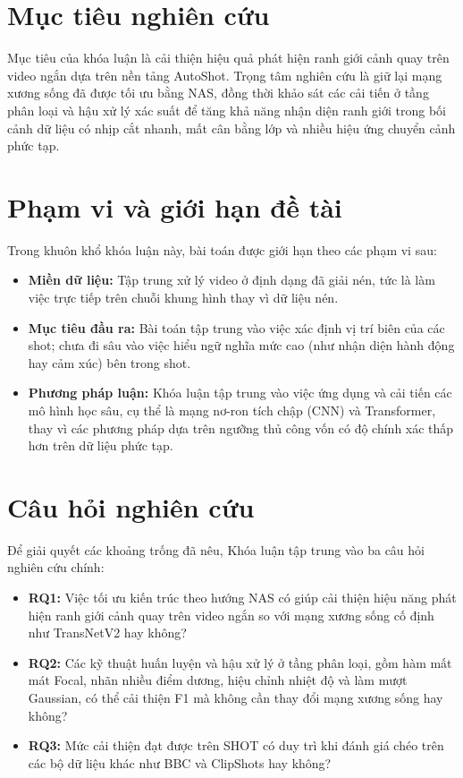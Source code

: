 \section{Mục tiêu nghiên cứu}
Mục tiêu của khóa luận là cải thiện hiệu quả phát hiện ranh giới cảnh quay trên video ngắn dựa trên nền tảng AutoShot. Trọng tâm nghiên cứu là giữ lại mạng xương sống đã được tối ưu bằng NAS, đồng thời khảo sát các cải tiến ở tầng phân loại và hậu xử lý xác suất để tăng khả năng nhận diện ranh giới trong bối cảnh dữ liệu có nhịp cắt nhanh, mất cân bằng lớp và nhiều hiệu ứng chuyển cảnh phức tạp.

\section{Phạm vi và giới hạn đề tài}
Trong khuôn khổ khóa luận này, bài toán được giới hạn theo các phạm vi sau:
\begin{itemize}
    \item \textbf{Miền dữ liệu:} Tập trung xử lý video ở định dạng đã giải nén, tức là làm việc trực tiếp trên chuỗi khung hình thay vì dữ liệu nén.
    \item \textbf{Mục tiêu đầu ra:} Bài toán tập trung vào việc xác định vị trí biên của các shot; chưa đi sâu vào việc hiểu ngữ nghĩa mức cao (như nhận diện hành động hay cảm xúc) bên trong shot.
    \item \textbf{Phương pháp luận:} Khóa luận tập trung vào việc ứng dụng và cải tiến các mô hình học sâu, cụ thể là mạng nơ-ron tích chập (CNN) và Transformer, thay vì các phương pháp dựa trên ngưỡng thủ công vốn có độ chính xác thấp hơn trên dữ liệu phức tạp.
\end{itemize}

\section{Câu hỏi nghiên cứu}
\label{sec:research_questions}
Để giải quyết các khoảng trống đã nêu, Khóa luận tập trung vào ba câu hỏi nghiên cứu chính:
\begin{itemize}
    \item \textbf{RQ1:} Việc tối ưu kiến trúc theo hướng NAS có giúp cải thiện hiệu năng phát hiện ranh giới cảnh quay trên video ngắn so với mạng xương sống cố định như TransNetV2 hay không?
    \item \textbf{RQ2:} Các kỹ thuật huấn luyện và hậu xử lý ở tầng phân loại, gồm hàm mất mát Focal, nhãn nhiều điểm dương, hiệu chỉnh nhiệt độ và làm mượt Gaussian, có thể cải thiện F1 mà không cần thay đổi mạng xương sống hay không?
    \item \textbf{RQ3:} Mức cải thiện đạt được trên SHOT có duy trì khi đánh giá chéo trên các bộ dữ liệu khác như BBC và ClipShots hay không?
\end{itemize}

